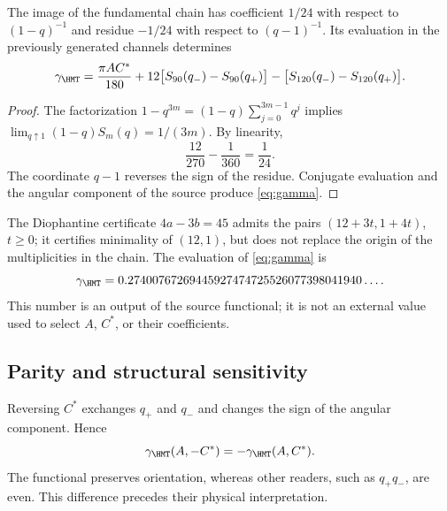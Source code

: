 \begin{theorem}
The image of the fundamental chain has coefficient $1/24$
with respect to $(1-q)^{-1}$ and residue $-1/24$ with respect to $(q-1)^{-1}$.
Its evaluation in the previously generated channels determines
\begin{equation}
\gamma_{\HMT}=
\frac{\pi AC^*}{180}
+12\bigl[S_{90}(q_-)-S_{90}(q_+)\bigr]
-\bigl[S_{120}(q_-)-S_{120}(q_+)\bigr].
\label{eq:gamma}
\end{equation}
\end{theorem}
\begin{proof}
The factorization $1-q^{3m}=(1-q)\sum_{j=0}^{3m-1}q^j$ implies
$\lim_{q\uparrow1}(1-q)S_m(q)=1/(3m)$. By linearity,
\[
\frac{12}{270}-\frac1{360}=\frac1{24}.
\]
The coordinate $q-1$ reverses the sign of the residue.
Conjugate evaluation and the angular component of the source
produce \eqref{eq:gamma}.
\end{proof}

The Diophantine certificate $4a-3b=45$ admits the pairs
$(12+3t,1+4t)$, $t\ge0$; it certifies minimality of $(12,1)$,
but does not replace the origin of the multiplicities in the chain.
The evaluation of \eqref{eq:gamma} is
\[
\gamma_{\HMT}
=0.27400767269445927474725526077398041940\ldots.
\]
This number is an output of the source functional; it is not an external value
used to select $A$, $C^*$, or their coefficients.

\subsection{Parity and structural sensitivity}
Reversing $C^*$ exchanges $q_+$ and $q_-$ and changes the sign
of the angular component. Hence
\[
\gamma_{\HMT}(A,-C^*)=-\gamma_{\HMT}(A,C^*).
\]
The functional preserves orientation, whereas other readers,
such as $q_+q_-$, are even. This difference precedes their physical interpretation.
